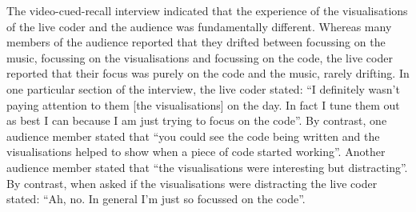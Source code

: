 \documentclass{sig-alternate}
\begin{document}
The video-cued-recall interview indicated that the experience of the visualisations of the live coder and the  audience was fundamentally different. Whereas many members of the audience reported that they drifted between focussing on the music, focussing on the visualisations and focussing on the code, the live coder reported that their focus was  purely on the code and the music, rarely drifting. In one particular section of the interview, the live coder stated: ``I definitely wasn't paying attention to them [the visualisations] on the day. In fact I tune them out as best I can because I am just trying to focus on the code''. By contrast, one audience member stated that ``you could see the code being written and the visualisations helped to show when a piece of code started working''. Another audience member stated that ``the visualisations were interesting but distracting''. By contrast, when asked if the visualisations were distracting the live coder stated: ``Ah, no. In general I'm just so focussed on the code''. 




\end{document}
